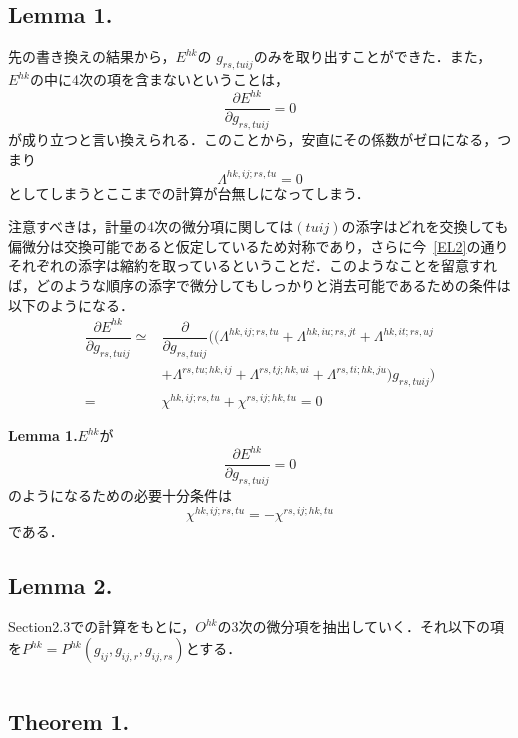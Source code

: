 \documentclass[12pt, a4paper]{jsarticle}
\newcommand{\lam}[1]{\varLambda^{#1}}
\newcommand{\x}[1]{\chi^{#1}}
\begin{document}
\subsection{Lemma 1.}
先の書き換えの結果から，\(E^{hk}\)の \(g_{rs,tuij}\)のみを取り出すことができた．また，\(E^{hk}\)の中に4次の項を含まないということは，
\begin{equation*}
  \dfrac{\partial E^{hk}}{\partial g_{rs,tuij} } = 0
\end{equation*}
が成り立つと言い換えられる．このことから，安直にその係数がゼロになる，つまり
\begin{equation*}
  \lam{hk,ij;rs,tu}=0
\end{equation*}
としてしまうとここまでの計算が台無しになってしまう．

注意すべきは，計量の4次の微分項に関しては\((tuij)\)の添字はどれを交換しても偏微分は交換可能であると仮定しているため対称であり，さらに今~\eqref{EL2}の通りそれぞれの添字は縮約を取っているということだ．このようなことを留意すれば，どのような順序の添字で微分してもしっかりと消去可能であるための条件は以下のようになる．
\begin{align*}
  \dfrac{\partial E^{hk}}{\partial g_{rs,tuij} }
  \simeq &
  \dfrac{\partial }{\partial g_{rs,tuij}  }
  (( \lam{hk,ij;rs,tu} + \lam{hk,iu;rs,jt} + \lam{hk,it;rs,uj}                      \\
         & +\lam{rs,tu;hk,ij} + \lam{rs,tj;hk,ui} + \lam{rs,ti;hk,ju}) g_{rs,tuij}) \\
  =      & \x{hk,ij;rs,tu}+\x{rs,ij;hk,tu}=0
\end{align*}

\textbf{Lemma 1.}\:\(E^{hk}\)が
\begin{equation*}
  \dfrac{\partial E^{hk}}{\partial g_{rs,tuij} } = 0
\end{equation*}
のようになるための必要十分条件は
\begin{equation*}
  \x{hk,ij;rs,tu}= -\x{rs,ij;hk,tu}
  \tag{2.14} \label{lemma1}
\end{equation*}
である．
\subsection{Lemma 2.}
Section2.3での計算をもとに，\(O^{hk}\)の3次の微分項を抽出していく．それ以下の項を\(P^{hk}=P^{hk}(g_{ij}, g_{ij,r},g_{ij,rs})\)とする．

\begin{equation*}

\end{equation*}
\subsection{Theorem 1.}
\end{document}
